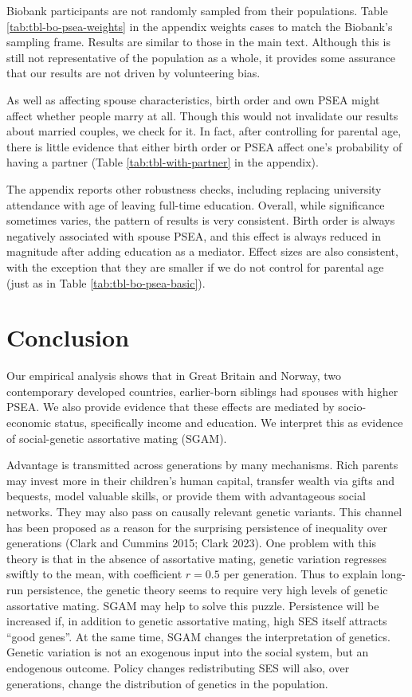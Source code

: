 \documentclass[
  12pt,
]{article}
\theoremstyle{definition}
\theoremstyle{definition}
\theoremstyle{definition}
\theoremstyle{definition}
\theoremstyle{remark}
\begin{document}
Biobank participants are not randomly sampled from their populations.
Table \ref{tab:tbl-bo-psea-weights} in the appendix weights cases to
match the Biobank's sampling frame. Results are similar to those in the
main text. Although this is still not representative of the population
as a whole, it provides some assurance that our results are not driven
by volunteering bias.

As well as affecting spouse characteristics, birth order and own PSEA
might affect whether people marry at all. Though this would not
invalidate our results about married couples, we check for it. In fact,
after controlling for parental age, there is little evidence that either
birth order or PSEA affect one's probability of having a partner (Table
\ref{tab:tbl-with-partner} in the appendix).

The appendix reports other robustness checks, including replacing
university attendance with age of leaving full-time education. Overall,
while significance sometimes varies, the pattern of results is very
consistent. Birth order is always negatively associated with spouse
PSEA, and this effect is always reduced in magnitude after adding
education as a mediator. Effect sizes are also consistent, with the
exception that they are smaller if we do not control for parental age
(just as in Table \ref{tab:tbl-bo-psea-basic}).

\section{Conclusion}\label{conclusion}

Our empirical analysis shows that in Great Britain and Norway, two
contemporary developed countries, earlier-born siblings had spouses with
higher PSEA. We also provide evidence that these effects are mediated by
socio-economic status, specifically income and education. We interpret
this as evidence of social-genetic assortative mating (SGAM).

Advantage is transmitted across generations by many mechanisms. Rich
parents may invest more in their children's human capital, transfer
wealth via gifts and bequests, model valuable skills, or provide them
with advantageous social networks. They may also pass on causally
relevant genetic variants. This channel has been proposed as a reason
for the surprising persistence of inequality over generations
(Clark and Cummins 2015; Clark 2023). One problem with
this theory is that in the absence of assortative mating, genetic
variation regresses swiftly to the mean, with coefficient \(r = 0.5\) per
generation. Thus to explain long-run persistence, the genetic theory
seems to require very high levels of genetic assortative mating. SGAM
may help to solve this puzzle. Persistence will be increased if, in
addition to genetic assortative mating, high SES itself attracts ``good
genes''. At the same time, SGAM changes the interpretation of genetics.
Genetic variation is not an exogenous input into the social system, but
an endogenous outcome. Policy changes redistributing SES will also, over
generations, change the distribution of genetics in the population.
\end{document}
